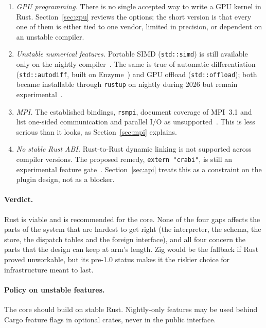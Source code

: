 \documentclass[11pt,a4paper]{article}
\newcommand{\code}[1]{\texttt{#1}}
\begin{document}
\begin{enumerate}
  \item \emph{GPU programming.}  There is no single accepted way to write a
        GPU kernel in Rust.  Section~\ref{sec:gpu} reviews the options; the
        short version is that every one of them is either tied to one vendor,
        limited in precision, or dependent on an unstable compiler.
  \item \emph{Unstable numerical features.}  Portable SIMD
        (\code{std::simd}) is still available only on the nightly
        compiler~\cite{portablesimd}.  The same is true of automatic
        differentiation (\code{std::autodiff}, built on
        Enzyme~\cite{enzyme}) and GPU offload (\code{std::offload}); both
        became installable through \code{rustup} on nightly during
        2026 but remain experimental~\cite{rustgsoc2026}.
  \item \emph{MPI.}  The established bindings, \code{rsmpi}, document coverage
        of MPI~3.1 and list one-sided communication and parallel I/O as
        unsupported~\cite{rsmpi}.  This is less serious than it looks, as
        Section~\ref{sec:mpi} explains.
  \item \emph{No stable Rust ABI.}  Rust-to-Rust dynamic linking is not
        supported across compiler versions.  The proposed remedy,
        \code{extern "crabi"}, is still an experimental feature
        gate~\cite{crabi}.  Section~\ref{sec:api} treats this as a constraint
        on the plugin design, not as a blocker.
\end{enumerate}

\paragraph{Verdict.}  Rust is viable and is recommended for the core.  None of
the four gaps affects the parts of the system that are hardest to get right
(the interpreter, the schema, the store, the dispatch tables and the foreign
interface), and all four concern the parts that the design can keep at arm's
length.  Zig would be the fallback if Rust proved unworkable, but its pre-1.0
status makes it the riskier choice for infrastructure meant to last.

\paragraph{Policy on unstable features.}  The core should build on stable
Rust.  Nightly-only features may be used behind Cargo feature flags in
optional crates, never in the public interface.
\end{document}
